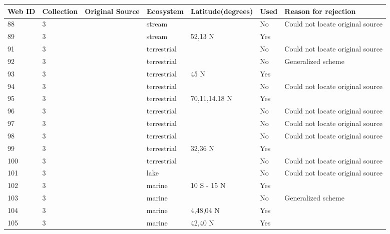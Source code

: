 \documentclass[12pt]{article}
\begin{document}
\begin{landscape}
    \begin{table}[h!]
    \centering
    {\footnotesize
      \begin{tabular}{p{2.8cm}p{1.3cm}p{5.5cm}p{2.2cm}p{2.5cm}lp{3.5cm}}
        \hline
        Web ID & Collection & Original Source & Ecosystem & Latitude(degrees) & Used  & Reason for rejection  \\
        \hline
        88    & 3 & \citet{Kuusela1980}  & stream &       & No    & Could not locate original source \\
        89    & 3 & \citet{Hartley1948}  & stream & 52,13 N & Yes   &       \\
        91    & 3 & \citet{Cohen1990}  & terrestrial &       & No    & Could not locate original source \\
        92    & 3 & \citet{Swan1961}  & terrestrial &       & No    & Generalized scheme \\
        93    & 3 & \citet{Pattie1966}    & terrestrial & 45 N  & Yes   &       \\
        94    & 3 & \citet{Brown1971}    & terrestrial &       & No    & Could not locate original source \\
        95    & 3 & \citet{Brown1975}    & terrestrial & 70,11,14.18 N & Yes   &       \\
        96    & 3 & \citet{Cohen1990}  & terrestrial &       & No    & Could not locate original source \\
        97    & 3 & \citet{Cohen1990}  & terrestrial &       & No    & Could not locate original source \\
        98    & 3 & \citet{Holm1980}  & terrestrial &       & No    & Could not locate original source \\
        99    & 3 & \citet{Howes1954}    & terrestrial & 32,36 N & Yes   &       \\
        100   & 3 & \citet{Cohen1990}  & terrestrial &       & No    & Could not locate original source \\
        101   & 3 & \citet{Cohen1990} & lake  &       & No    & Could not locate original source \\
        102   & 3 & \citet{Shushkina1979}  & marine & 10 S - 15 N & Yes   &       \\
        103   & 3 & \citet{Petipa1979}  & marine &       & No    & Generalized scheme \\
        104   & 3 & \citet{Menge1976}  & marine & 4,48,04 N & Yes   &       \\
        105   & 3 & \citet{Edwards1982}  & marine & 42,40 N & Yes   &       \\

\end{tabular}}
\end{table}
\end{landscape}
\end{document}
